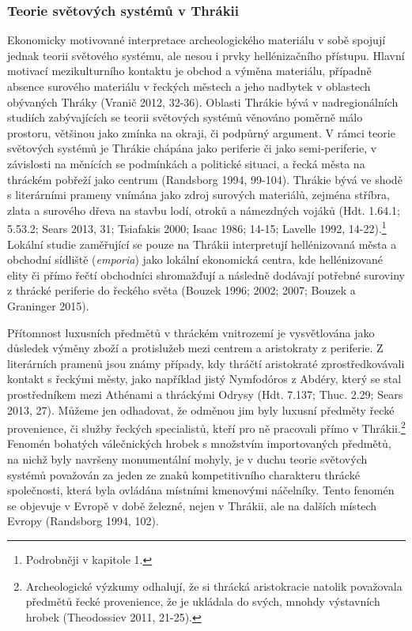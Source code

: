 \subsubsection[teorie-světových-systémů-v-thrákii]{Teorie světových systémů v Thrákii}

Ekonomicky motivované interpretace archeologického materiálu v sobě spojují jednak teorii světového systému, ale nesou i prvky hellénizačního přístupu. Hlavní motivací mezikulturního kontaktu je obchod a výměna materiálu, případně absence surového materiálu v řeckých městech a jeho nadbytek v oblastech obývaných Thráky (Vranič 2012, 32-36). Oblasti Thrákie bývá v nadregionálních studiích zabývajících se teorii světových systémů věnováno poměrně málo prostoru, většinou jako zmínka na okraji, či podpůrný argument. V rámci teorie světových systémů je Thrákie chápána jako periferie či jako semi-periferie, v závislosti na měnících se podmínkách a politické situaci, a řecká města na thráckém pobřeží jako centrum (Randsborg 1994, 99-104). Thrákie bývá ve shodě s literárními prameny vnímána jako zdroj surových materiálů, zejména stříbra, zlata a surového dřeva na stavbu lodí, otroků a námezdných vojáků (Hdt. 1.64.1; 5.53.2; Sears 2013, 31; Tsiafakis 2000; Isaac 1986; 14-15; Lavelle 1992, 14-22).\footnote{Podrobněji v kapitole 1.} Lokální studie zaměřující se pouze na Thrákii interpretují hellénizovaná města a obchodní sídliště ({\em emporia}) jako lokální ekonomická centra, kde hellénizované elity či přímo řečtí obchodníci shromažďují a následně dodávají potřebné suroviny z thrácké periferie do řeckého světa (Bouzek 1996; 2002; 2007; Bouzek a Graninger 2015).

Přítomnost luxusních předmětů v thráckém vnitrozemí je vysvětlována jako důsledek výměny zboží a protislužeb mezi centrem a aristokraty z periferie. Z literárních pramenů jsou známy případy, kdy thráčtí aristokraté zprostředkovávali kontakt s řeckými městy, jako například jistý Nymfodóros z Abdéry, který se stal prostředníkem mezi Athénami a thráckými Odrysy (Hdt. 7.137; Thuc. 2.29; Sears 2013, 27). Můžeme jen odhadovat, že odměnou jim byly luxusní předměty řecké provenience, či služby řeckých specialistů, kteří pro ně pracovali přímo v Thrákii.\footnote{Archeologické výzkumy odhalují, že si thrácká aristokracie natolik považovala předmětů řecké provenience, že je ukládala do svých, mnohdy výstavních hrobek (Theodossiev 2011, 21-25).} Fenomén bohatých válečnických hrobek s množstvím importovaných předmětů, na nichž byly navršeny monumentální mohyly, je v duchu teorie světových systémů považován za jeden ze znaků kompetitivního charakteru thrácké společnosti, která byla ovládána místními kmenovými náčelníky. Tento fenomén se objevuje v Evropě v době železné, nejen v Thrákii, ale na dalších místech Evropy (Randsborg 1994, 102).

